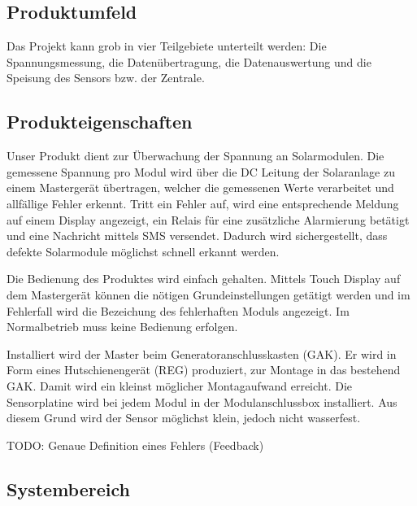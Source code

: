 \subsection{Produktumfeld}


Das   Projekt   kann  grob   in   vier   Teilgebiete  unterteilt   werden: Die
Spannungsmessung, die Daten\"ubertragung, die Datenauswertung und die Speisung
des Sensors bzw. der Zentrale.


\subsection{Produkteigenschaften}
\label{subsec:produkteigenschaften}

Unser  Produkt  dient  zur  \"Uberwachung der  Spannung  an  Solarmodulen. Die
gemessene Spannung  pro Modul wird  \"uber die  DC Leitung der  Solaranlage zu
einem Masterger\"at \"ubertragen, welcher die gemessenen Werte verarbeitet und
allf\"allige  Fehler erkennt. Tritt  ein Fehler  auf, wird  eine entsprechende
Meldung  auf einem  Display  angezeigt, ein  Relais  f\"ur eine  zus\"atzliche
Alarmierung bet\"atigt und eine  Nachricht mittels SMS versendet. Dadurch wird
sichergestellt, dass defekte Solarmodule m\"oglichst schnell erkannt werden.

Die Bedienung des  Produktes wird einfach gehalten. Mittels  Touch Display auf
dem Masterger\"at k\"onnen die  n\"otigen Grundeinstellungen get\"atigt werden
und im  Fehlerfall wird die  Bezeichung des fehlerhaften  Moduls angezeigt. Im
Normalbetrieb muss keine Bedienung erfolgen.

Installiert  wird  der  Master beim  Generatoranschlusskasten  (GAK). Er  wird
in  Form  eines  Hutschienenger\"at  (REG)  produziert,  zur  Montage  in  das
bestehend GAK. Damit wird ein kleinst m\"oglicher Montagaufwand erreicht.  Die
Sensorplatine wird  bei jedem Modul in  der Modulanschlussbox installiert. Aus
diesem Grund wird der Sensor m\"oglichst klein, jedoch nicht wasserfest.

\textsc{TODO}: Genaue Definition eines Fehlers (Feedback)


\subsection{Systembereich}

